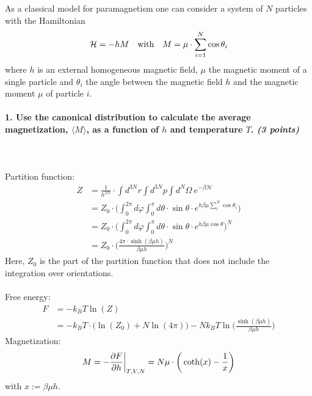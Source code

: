 As a classical model for paramagnetism one 
can consider a system of $N$ particles with 
the Hamiltonian
\begin{equation}
    \mathcal{H}=-hM
    \ \ \ \textnormal{with}\ \ \ 
    M=\mu\cdot\sum_{i=1}^N\cos\theta_i
\end{equation}
where $h$ is an external homogeneous magnetic 
field, $\mu$ the magnetic moment of a single 
particle and $\theta_i$ the angle between the
magnetic field $h$ and the magnetic moment
$\mu$ of particle $i$.

\paragraph{1. Use the canonical distribution 
    to calculate the average magnetization, 
    $\langle M\rangle$, as a function of $h$
    and temperature $T$. 
    \textit{(3 points)}
} \ \\
    \\
    Partition function:
    \begin{align}
        Z
        &=\frac{1}{h^{3N}}\cdot
        \int d^{3N}r 
        \int d^{3N}p
        \int d^N\Omega\
        e^{-\beta\mathcal{H}} \\
        &=Z_0\cdot\bigg(
            \int_0^{2\pi}d\varphi 
            \int_0^\pi d\theta
            \cdot\sin\theta\cdot 
            e^{h\beta\mu\sum_i^N\cos\theta_i}
        \bigg) \\
        &=Z_0\cdot\bigg(
            \int_0^{2\pi}d\varphi 
            \int_0^\pi d\theta
            \cdot\sin\theta\cdot 
            e^{h\beta\mu\cos\theta}
    \bigg)^N \\
        &=Z_0\cdot\bigg(
            \frac{4\pi\cdot\sinh(\beta\mu h)}
            {\beta\mu h}
        \bigg)^N
    \end{align}
    Here, $Z_0$ is the part of the partition 
    function that does not include the 
    integration over orientations. \\
    \\
    Free energy:
    \begin{align}
        F
        &=-k_BT\ln(Z) \\
        &=-k_BT\cdot\bigg(
            \ln(Z_0)+N\ln(4\pi)
        \bigg)-Nk_BT\ln\bigg(
            \frac{\sinh(\beta\mu h)}{\beta\mu h}
        \bigg)
    \end{align}
    Magnetization:
    \begin{align}
        M
        =-\frac{\partial F}{\partial h}\bigg|_{T,V,N}
        =N\mu\cdot\bigg(\coth(x)
        -\frac{1}{x}\bigg)
    \end{align}
    with $x:=\beta\mu h$.

